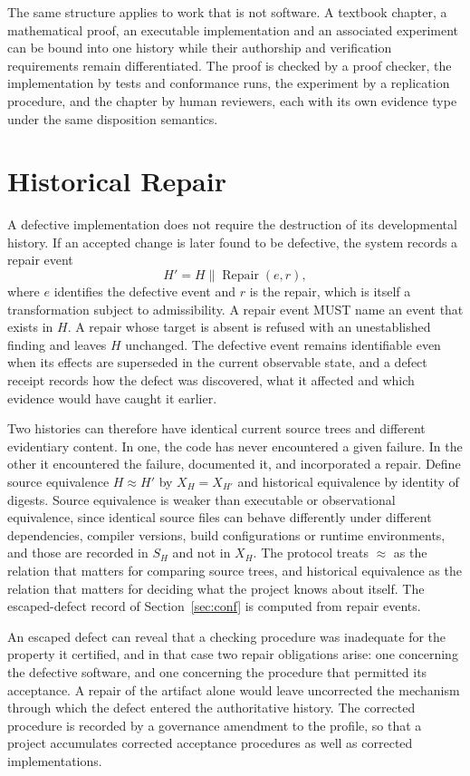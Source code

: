 \documentclass[11pt]{article}
\theoremstyle{remark}
\newcommand{\concat}{\mathbin{\|}}
\begin{document}
The same structure applies to work that is not software. A textbook chapter, a mathematical proof, an executable implementation and an associated experiment can be bound into one history while their authorship and verification requirements remain differentiated. The proof is checked by a proof checker, the implementation by tests and conformance runs, the experiment by a replication procedure, and the chapter by human reviewers, each with its own evidence type under the same disposition semantics.

\section{Historical Repair}\label{sec:repair}

A defective implementation does not require the destruction of its developmental history. If an accepted change is later found to be defective, the system records a repair event
\[
H'=H\concat\operatorname{Repair}(e,r),
\]
where $e$ identifies the defective event and $r$ is the repair, which is itself a transformation subject to admissibility. A repair event MUST name an event that exists in $H$. A repair whose target is absent is refused with an unestablished finding and leaves $H$ unchanged. The defective event remains identifiable even when its effects are superseded in the current observable state, and a defect receipt records how the defect was discovered, what it affected and which evidence would have caught it earlier.

Two histories can therefore have identical current source trees and different evidentiary content. In one, the code has never encountered a given failure. In the other it encountered the failure, documented it, and incorporated a repair. Define source equivalence $H\approx H'$ by $X_H=X_{H'}$ and historical equivalence by identity of digests. Source equivalence is weaker than executable or observational equivalence, since identical source files can behave differently under different dependencies, compiler versions, build configurations or runtime environments, and those are recorded in $S_H$ and not in $X_H$. The protocol treats $\approx$ as the relation that matters for comparing source trees, and historical equivalence as the relation that matters for deciding what the project knows about itself. The escaped-defect record of Section~\ref{sec:conf} is computed from repair events.

An escaped defect can reveal that a checking procedure was inadequate for the property it certified, and in that case two repair obligations arise: one concerning the defective software, and one concerning the procedure that permitted its acceptance. A repair of the artifact alone would leave uncorrected the mechanism through which the defect entered the authoritative history. The corrected procedure is recorded by a governance amendment to the profile, so that a project accumulates corrected acceptance procedures as well as corrected implementations.
\end{document}
